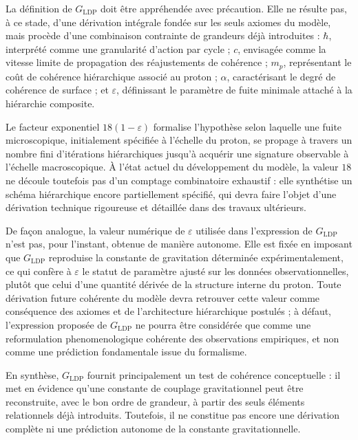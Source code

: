 \documentclass[11pt,a4paper]{article}
\begin{document}
La définition de \(G_{\mathrm{LDP}}\) doit être appréhendée avec précaution. Elle ne résulte pas, à ce stade, d’une dérivation intégrale fondée sur les seuls axiomes du modèle, mais procède d’une combinaison contrainte de grandeurs déjà introduites : \(\hbar\), interprété comme une granularité d’action par cycle ; \(c\), envisagée comme la vitesse limite de propagation des réajustements de cohérence ; \(m_p\), représentant le coût de cohérence hiérarchique associé au proton ; \(\alpha\), caractérisant le degré de cohérence de surface ; et \(\varepsilon\), définissant le paramètre de fuite minimale attaché à la hiérarchie composite.

Le facteur exponentiel \(18\left(1-\varepsilon\right)\) formalise l’hypothèse selon laquelle une fuite microscopique, initialement spécifiée à l’échelle du proton, se propage à travers un nombre fini d’itérations hiérarchiques jusqu’à acquérir une signature observable à l’échelle macroscopique. À l’état actuel du développement du modèle, la valeur \(18\) ne découle toutefois pas d’un comptage combinatoire exhaustif : elle synthétise un schéma hiérarchique encore partiellement spécifié, qui devra faire l’objet d’une dérivation technique rigoureuse et détaillée dans des travaux ultérieurs.

De façon analogue, la valeur numérique de \(\varepsilon\) utilisée dans l’expression de \(G_{\mathrm{LDP}}\) n’est pas, pour l’instant, obtenue de manière autonome. Elle est fixée en imposant que \(G_{\mathrm{LDP}}\) reproduise la constante de gravitation déterminée expérimentalement, ce qui confère à \(\varepsilon\) le statut de paramètre ajusté sur les données observationnelles, plutôt que celui d’une quantité dérivée de la structure interne du proton. Toute dérivation future cohérente du modèle devra retrouver cette valeur comme conséquence des axiomes et de l’architecture hiérarchique postulés ; à défaut, l’expression proposée de \(G_{\mathrm{LDP}}\) ne pourra être considérée que comme une reformulation phenomenologique cohérente des observations empiriques, et non comme une prédiction fondamentale issue du formalisme.

En synthèse, \(G_{\mathrm{LDP}}\) fournit principalement un test de cohérence conceptuelle : il met en évidence qu’une constante de couplage gravitationnel peut être reconstruite, avec le bon ordre de grandeur, à partir des seuls éléments relationnels déjà introduits. Toutefois, il ne constitue pas encore une dérivation complète ni une prédiction autonome de la constante gravitationnelle.
\end{document}
